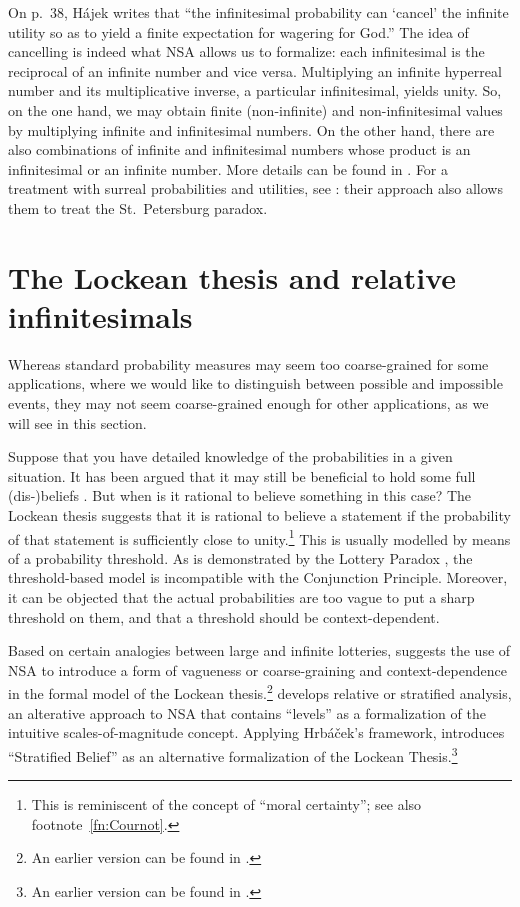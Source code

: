On p.~38, H\'ajek writes that ``the infinitesimal probability can `cancel' the infinite utility so as to yield a finite expectation for wagering for God.''
The idea of cancelling is indeed what NSA allows us to formalize: each infinitesimal is the reciprocal of an infinite number and vice versa. Multiplying an infinite hyperreal number and its multiplicative inverse, a particular infinitesimal, yields unity. So, on the one hand, we may obtain finite (non-infinite) and non-infinitesimal values by multiplying infinite and infinitesimal numbers. On the other hand, there are also combinations of infinite and infinitesimal numbers whose product is an infinitesimal or an infinite number. More details can be found in \citet{Wenmackers:forthc}. For a treatment with surreal probabilities and utilities, see \citet{ChenRubio:forthc}: their approach also allows them to treat the St.~Petersburg paradox.

\section{The Lockean thesis and relative infinitesimals}\label{sec:LT}
Whereas standard probability measures may seem too coarse-grained for some applications, where we would like to distinguish between possible and impossible events, they may not seem coarse-grained enough for other applications, as we will see in this section.

Suppose that you have detailed knowledge of the probabilities in a given situation. It has been argued that it may still be beneficial to hold some full (dis-)beliefs \citep{Foley:2009}. But when is it rational to believe something in this case? The Lockean thesis suggests that it is rational to believe a statement if the probability of that statement is sufficiently close to unity.\footnote{This is reminiscent of the concept of ``moral certainty''; see also footnote~\ref{fn:Cournot}.} This is usually modelled by means of a probability threshold. As is demonstrated by the Lottery Paradox \citep{Kyburg:1961}, the threshold-based model is incompatible with the Conjunction Principle. Moreover, it can be objected that the actual probabilities are too vague to put a sharp threshold on them, and that a threshold should be context-dependent.

Based on certain analogies between large and infinite lotteries, \citet{Wenmackers:2012f} suggests the use of NSA to introduce a form of vagueness or coarse-graining and context-dependence in the formal model of the Lockean thesis.\footnote{An earlier version can be found in \citet[Ch.~4]{Wenmackers:2011a}.} \citet{Hrbacek:2007} develops relative or stratified analysis, an alterative approach to NSA that contains ``levels'' as a formalization of the intuitive scales-of-magnitude concept. Applying Hrb\'{a}\v{c}ek's framework, \citet{Wenmackers:2013} introduces ``Stratified Belief'' as an alternative formalization of the Lockean Thesis.\footnote{An earlier version can be found in \citet[Ch.~3]{Wenmackers:2011a}.}

